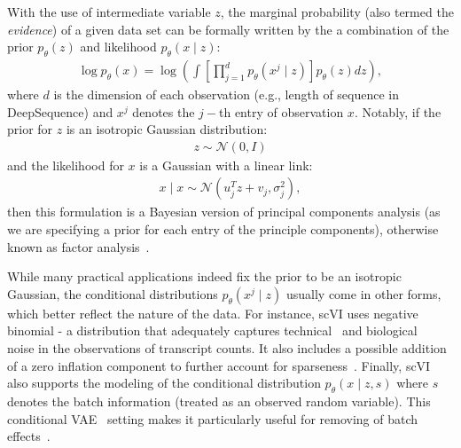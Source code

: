 With the use of intermediate variable $z$, the marginal probability (also termed the \emph{evidence}) of a given data set can be formally written by the a combination of the prior $p_\theta(z)$ and likelihood $p_\theta(x\mid z)$:
\begin{align}
\label{factorization}
\log p_\theta(x) = \log\left(\int \left[\prod_{j=1}^dp_\theta(x^j \mid z)\right]p_\theta(z)dz\right),
\end{align}
where $d$ is the dimension of each observation (e.g., length of sequence in DeepSequence) and $x^j$ denotes the $j-$th entry of observation $x$.
Notably, if the prior for $z$ is an isotropic Gaussian distribution:
\begin{align}
    z \sim \mathcal{N}(0, I)
\end{align}
and the likelihood for $x$ is a Gaussian with a linear link:
\begin{align}
    x \mid x \sim \mathcal{N}(u_j^Tz + v_j, \sigma_j^2),
\end{align}
then this formulation is a Bayesian version of principal components analysis (as we are specifying a prior for each entry of the principle components), otherwise known as factor analysis~\cite{Jolliffe1986}. 

While many practical applications indeed fix the prior to be an isotropic Gaussian,
the conditional distributions $p_\theta(x^j\mid z)$ usually come in other forms, which better reflect the nature of the data. For instance, scVI uses negative binomial - a distribution that adequately captures technical~\cite{love2014moderated} and biological~\cite{Grun2014a} noise in the observations of transcript counts. It also includes a possible addition of a zero inflation component to further account for sparseness~\cite{AutoZI}. Finally, scVI also supports the modeling of the conditional distribution $p_\theta(x \mid z, s)$ where $s$ denotes the batch information (treated as an observed random variable). This conditional VAE~\cite{Louizos2016} setting makes it particularly useful for removing of batch effects~\cite{Xu2019}. 

